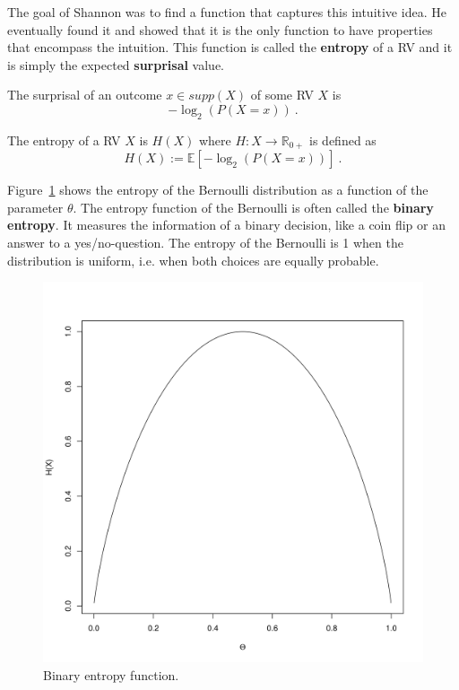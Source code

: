 The goal of Shannon was to find a function that captures this intuitive idea. He eventually found it and showed that it is the only function to have properties
that encompass the intuition. This function is called the \textbf{entropy} of a RV and it is simply the expected \textbf{surprisal} value.

\begin{Definition}[Surprisal]
The surprisal of an outcome $ x \in supp(X) $ of some RV $ X $ is
$$ -\log_{2}(P(X=x)) \ . $$
\end{Definition} 

\begin{Definition}[Entropy]
The entropy of a RV $ X $ is $ H(X) $ where $ H : X \rightarrow \mathbb{R}_{0+} $ is defined as
$$ H(X) := \mathbb{E}[-\log_{2}(P(X=x))] \ . $$
\end{Definition}

Figure~\ref{fig:binaryEntropy} shows the entropy of the Bernoulli distribution as a function of the
parameter $ \theta $. The entropy function of the Bernoulli is often called the \textbf{binary entropy}.
It measures the information of a binary decision, like a coin flip or an answer to a yes/no-question.
The entropy of the Bernoulli is 1 when the distribution is uniform, i.e. when both choices are equally 
probable. 

\begin{figure}
\center
\includegraphics[scale=0.5]{binaryEntropy.png}
\caption{Binary entropy function.}
\label{fig:binaryEntropy}
\end{figure}

